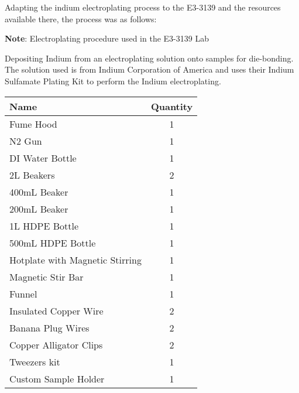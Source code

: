Adapting the indium electroplating process to the E3-3139 and the resources available there, the process was as follows:

\begin{center} %
    \begin{framed} %
        \begin{minipage}{0.8\textwidth} %
            \raggedright %
            \textbf{Note}: Electroplating procedure used in the E3-3139 Lab

            \vspace{0.1cm} %

            Depositing Indium from an electroplating solution onto samples for die-bonding. The solution used is from Indium Corporation of America and uses their Indium Sulfamate Plating Kit to perform the Indium electroplating.

            \begin{center}

            \begin{tabular}{|l|c|}
                \hline
                \textbf{Name}  &   \textbf{Quantity} \\
                \hline
                Fume Hood                           &	1 \\
                N2 Gun                              &	1 \\
                DI Water Bottle                     &	1 \\
                2L Beakers                          &	2 \\
                400mL Beaker                        &	1 \\
                200mL Beaker                        &	1 \\
                1L HDPE Bottle                      &	1 \\
                500mL HDPE Bottle                   &	1 \\
                Hotplate with Magnetic Stirring     &	1 \\
                Magnetic Stir Bar                   &   1 \\
                Funnel                              &	1 \\
                Insulated Copper Wire               &	2 \\
                Banana Plug Wires                   &	2 \\
                Copper Alligator Clips              &	2 \\
                Tweezers kit                        &	1 \\
                Custom Sample Holder                &	1 \\
                \hline
            \end{tabular}


\end{center}
\end{minipage}
\end{framed}
\end{center}

